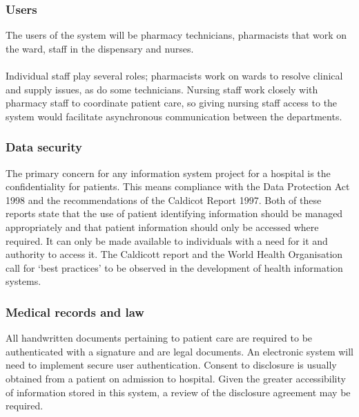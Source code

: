 \documentclass[letterpaper]{amsart}
\begin{document}
\subsubsection{Users} The users of the system will be pharmacy technicians, pharmacists that work on the ward, staff in the dispensary and nurses.  
\paragraph{ } Individual staff play several roles; pharmacists work on wards to resolve clinical and supply issues, as do some technicians. Nursing staff work closely with pharmacy staff to coordinate patient care, so giving nursing staff access to the system would facilitate asynchronous communication between the departments.  
\subsubsection{Data security} The primary concern for any information system project for a hospital is the confidentiality for patients.  This means compliance with the Data Protection Act 1998 and the recommendations of the Caldicot Report 1997.\cite{Caldicott}  Both of these reports state that the use of patient identifying information should be managed appropriately and that patient information should only be accessed where required. It can only be made available to individuals with a need for it and authority to access it. The Caldicott report and the World Health Organisation call for `best practices' to be observed in the development of health information systems\cite{whosec}.
\subsubsection{Medical records and law } All handwritten documents pertaining to patient care are required to be authenticated with a signature and are legal documents.  An electronic system will need to implement secure user authentication.  Consent to disclosure is usually obtained from a patient on admission to hospital. Given the greater accessibility of information stored in this system, a review of the disclosure agreement may be required.
\end{document}
